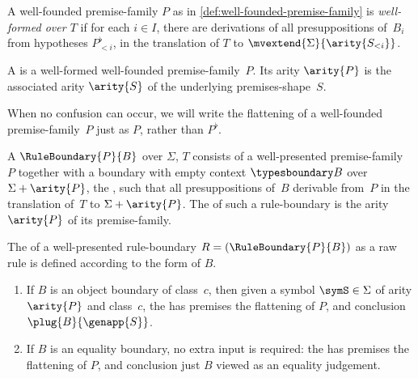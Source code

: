 \begin{definition} \label{def:well-presented-premise-family}
  A well-founded premise-family $P$ as in \cref{def:well-founded-premise-family} is
  \emph{well-formed over $T$} if for each $i \in I$, there are derivations of all presuppositions of~$B_i$ from hypotheses $P_{<i}^\flat$, in the translation of $T$ to $\mvextend{\Sigma}{\arity{S_{<i}}}$.

  A  is a well-formed well-founded premise-family~$P$.
  Its arity $\arity{P}$ is the associated arity $\arity{S}$ of the underlying premises-shape~$S$.
\end{definition}

\noindent
%
When no confusion can occur, we will write the flattening of a well-founded premise-family~$P$ just as $P$, rather than $P^\flat$.

\begin{definition}
  \label{def:well-presented-rule-boundary}%
  A  $\RuleBoundary{P}{B}$ over $\Sigma$, $T$ consists of a well-presented premise-family~$P$ together with a boundary with empty context $\typesboundary B$ over $\Sigma + \arity{P}$, the , such that all presuppositions of~$B$ derivable from~$P$ in the translation of~$T$ to $\Sigma + \arity{P}$.
  The  of such a rule-boundary is the arity~$\arity{P}$ of its premise-family.
\end{definition}

\begin{definition}
  \label{def:realisation-well-presented-rule}%
  The  of a well-presented rule-boundary $R = (\RuleBoundary{P}{B})$ as a raw rule is defined according to the form of $B$.
  \begin{enumerate}
  \item
    If $B$ is an object boundary of class~$c$, then given a symbol $\symS \in \Sigma$ of arity $\arity{P}$ and class~$c$, the  has premises the flattening of $P$, and conclusion $\plug{B}{\genapp{S}}$.

  \item
    If $B$ is an equality boundary, no extra input is required: the  has premises the flattening of $P$, and conclusion just $B$ viewed as an equality judgement.
  \end{enumerate}
\end{definition}


